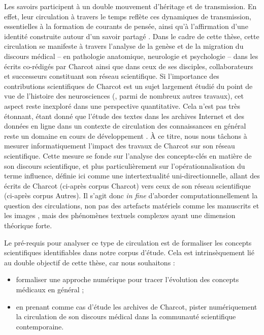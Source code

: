Les savoirs participent à un double mouvement d'héritage et de transmission. En effet, leur circulation à travers le temps reflète ces dynamiques de transmission, essentielles à la formation de courants de pensée, ainsi qu'à l'affirmation d’une identité construite autour d'un savoir partagé \citep[p.~251]{adell2011chapitre}. Dans le cadre de cette thèse, cette circulation se manifeste à travers l'analyse de la genèse et de la migration du discours médical -- en pathologie anatomique, neurologie et psychologie -- dans les écrits co-rédigés par Charcot ainsi que dans ceux de ses disciples, collaborateurs et successeurs constituant son \og{}réseau scientifique\fg{}. Si l'importance des contributions scientifiques de Charcot est un sujet largement étudié du point de vue de l'histoire des neurosciences (\citealp{bogousslavsky2011following,broussolle2012,camargo2024}, parmi de nombreux autres travaux), cet aspect reste inexploré dans une perspective quantitative. Cela n'est pas très étonnant, étant donné que l'étude des textes dans les archives Internet et des données en ligne dans un contexte de circulation des connaissances en général reste un domaine en cours de développement \citep{milia2023}. À ce titre, nous nous tâchons à mesurer informatiquement l'impact des travaux de Charcot sur son réseau scientifique. Cette mesure se fonde sur l'analyse des concepts-clés en matière de son discours scientifique, et plus particulièrement sur l'opérationnalisation du terme \og{}influence\fg{}, définie ici comme une intertextualité uni-directionnelle, allant des écrits de Charcot (ci-après corpus \og{}Charcot\fg{}) vers ceux de son réseau scientifique (ci-après corpus \og{}Autres\fg{}). Il s'agit donc \textit{in fine} d'aborder computationnellement la question des circulations, non pas des artefacts matériels comme les manuscrits \citep{gabay2021katabase} et les images \citep{joyeux2019visual}, mais des phénomènes textuels complexes \citep{manjavacas} ayant une dimension théorique forte. 

Le pré-requis pour analyser ce type de circulation est de formaliser les concepts scientifiques identifiables dans notre corpus d'étude.
Cela est intrinsèquement lié au double objectif de cette thèse, car nous souhaitons :
\begin{itemize} 
	\item formaliser une approche numérique pour tracer l'évolution des concepts médicaux en général ;
	\item en prenant comme cas d'étude les archives de Charcot, pister numériquement la circulation de son discours médical dans la communauté scientifique contemporaine.
\end{itemize}
\medskip

